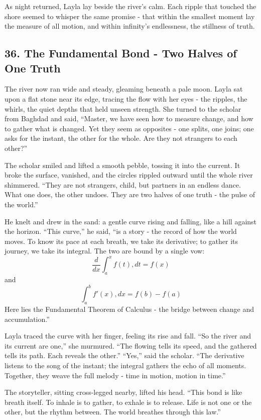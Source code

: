 \documentclass[
  letterpaper,
  DIV=11,
  numbers=noendperiod]{scrreprt}
\begin{document}
As night returned, Layla lay beside the river's calm. Each ripple that
touched the shore seemed to whisper the same promise - that within the
smallest moment lay the measure of all motion, and within infinity's
endlessness, the stillness of truth.

\subsection{36. The Fundamental Bond - Two Halves of One
Truth}\label{the-fundamental-bond---two-halves-of-one-truth}

The river now ran wide and steady, gleaming beneath a pale moon. Layla
sat upon a flat stone near its edge, tracing the flow with her eyes -
the ripples, the whirls, the quiet depths that held unseen strength. She
turned to the scholar from Baghdad and said, ``Master, we have seen how
to measure change, and how to gather what is changed. Yet they seem as
opposites - one splits, one joins; one asks for the instant, the other
for the whole. Are they not strangers to each other?''

The scholar smiled and lifted a smooth pebble, tossing it into the
current. It broke the surface, vanished, and the circles rippled outward
until the whole river shimmered. ``They are not strangers, child, but
partners in an endless dance. What one does, the other undoes. They are
two halves of one truth - the pulse of the world.''

He knelt and drew in the sand: a gentle curve rising and falling, like a
hill against the horizon. ``This curve,'' he said, ``is a story - the
record of how the world moves. To know its pace at each breath, we take
its derivative; to gather its journey, we take its integral. The two are
bound by a single vow: \[
\frac{d}{dx} \int_a^x f(t),dt = f(x)
\] and \[
\int_a^b f'(x),dx = f(b) - f(a)
\] Here lies the Fundamental Theorem of Calculus - the bridge between
change and accumulation.''

Layla traced the curve with her finger, feeling its rise and fall. ``So
the river and its current are one,'' she murmured. ``The flowing tells
its speed, and the gathered tells its path. Each reveals the other.''
``Yes,'' said the scholar. ``The derivative listens to the song of the
instant; the integral gathers the echo of all moments. Together, they
weave the full melody - time in motion, motion in time.''

The storyteller, sitting cross-legged nearby, lifted his head. ``This
bond is like breath itself. To inhale is to gather, to exhale is to
release. Life is not one or the other, but the rhythm between. The world
breathes through this law.''
\end{document}
